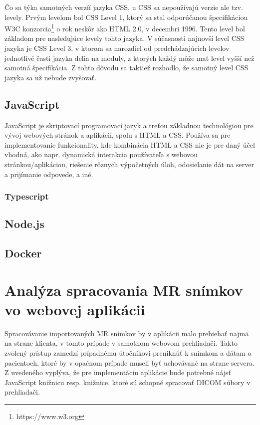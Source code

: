 Čo sa týka samotných verzíí jazyka CSS, u CSS sa nepoužívajú verzie ale tzv. levely. Prvým levelom bol CSS Level 1, ktorý sa stal odporúčanou špecifikáciou W3C konzorcia\footnote{https://www.w3.org} o rok neskôr ako HTML 2.0, v decembri 1996. Tento level bol základom pre nasledujúce levely tohto jazyka. V súčasnosti najnovší level CSS jazyka je CSS Level 3, v ktorom sa narozdiel od predchádzajúcich levelov jednotlivé časti jazyka delia na moduly, z ktorých každý môže mať level vyšší než samotná špecifikácia. Z tohto dôvodu sa taktiež rozhodlo, že samotný level CSS jazyka sa už nebude zvyšovať.

\subsection {JavaScript}
JavaScript je skriptovací programovací jazyk a treťou základnou technológiou pre vývoj webových stránok a aplikácií, spolu s HTML a CSS. Používa sa pre implementovanie funkcionality, kde kombinácia HTML a CSS nie je pre daný účel vhodná, ako napr. dynamická interakcia používateľa s webovou stránkou/aplikáciou, riešenie rôznych výpočetných úloh, odosielanie dát na server a prijímanie odpovede, a iné. 

\subsubsection {Typescript}

\subsection {Node.js}

\subsection {Docker}

\section {Analýza spracovania MR snímkov vo webovej aplikácii}
Spracovávanie importovaných MR snímkov by v aplikácii malo prebiehať najmä na strane klienta, v tomto prípade v samotnom webovom prehliadači. Takto zvolený prístup zamedzí prípadnému útočníkovi preniknúť k snímkom a dátam o pacientoch, ktoré by v opačnom prípade museli byť uchovávané na strane servera. Z uvedeného vyplýva, že pre implementáciu aplikácie bude potrebné nájsť JavaScript knižnicu resp. knižnice, ktoré sú schopné spracovať DICOM súbory v prehliadači. 


